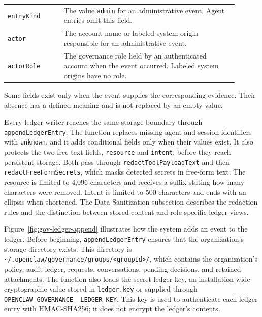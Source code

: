 \begin{table}[htbp]
\begin{tabular}{@{}p{0.22\linewidth}p{0.68\linewidth}@{}}
\texttt{entryKind} &
The value \texttt{admin} for an administrative event. Agent entries omit this field. \\

\texttt{actor} &
The account name or labeled system origin responsible for an administrative event. \\

\texttt{actorRole} &
The governance role held by an authenticated account when the event occurred. Labeled system origins have no role. \\
\bottomrule
\end{tabular}
\end{table}

Some fields exist only when the event supplies the corresponding evidence. Their absence has a defined meaning and is not replaced by an empty value.

Every ledger writer reaches the same storage boundary through
\texttt{appendLedgerEntry}. The function replaces missing agent and session identifiers with \texttt{unknown}, and it adds conditional fields only when their values exist. It also protects the two free-text fields,  \texttt{resource} and \texttt{intent}, before they reach persistent storage. {\color{red}Both pass through
\texttt{redactToolPayloadText} and then \texttt{redactFreeFormSecrets}, which
masks detected secrets in free-form text.} The resource is limited to 4,096 characters and receives a suffix stating how many characters were removed. Intent is limited to 500 characters and ends with an ellipsis when shortened. The Data Sanitization subsection describes the redaction rules and the distinction between stored content and role-specific ledger views.

Figure~\ref{fig:gov-ledger-append} illustrates how the system adds an event to the ledger. Before beginning, \texttt{appendLedgerEntry} ensures that the organization’s storage directory exists. This directory is \texttt{\textasciitilde/.openclaw/governance/groups/<groupId>/}, which contains the organization’s policy, audit ledger, requests, conversations, pending decisions, and retained attachments. The function also loads the secret ledger key, an installation-wide cryptographic value stored in \texttt{ledger.key} or supplied through \texttt{OPENCLAW\_GOVERNANCE\_ \break LEDGER\_KEY}. This key is used to authenticate each ledger entry with HMAC-SHA256; it does not encrypt the ledger’s contents.

